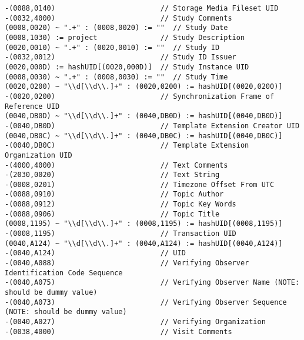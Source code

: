 \documentclass{beamer}  %
\begin{document}
\begin{frame}[fragile]
\tiny
\begin{verbatim}
-(0088,0140)                         // Storage Media Fileset UID
-(0032,4000)                         // Study Comments
(0008,0020) ~ ".+" : (0008,0020) := ""  // Study Date
(0008,1030) := project               // Study Description
(0020,0010) ~ ".+" : (0020,0010) := ""  // Study ID
-(0032,0012)                         // Study ID Issuer
(0020,000D) := hashUID[(0020,000D)]  // Study Instance UID
(0008,0030) ~ ".+" : (0008,0030) := ""  // Study Time
(0020,0200) ~ "\\d[\\d\\.]+" : (0020,0200) := hashUID[(0020,0200)]
-(0020,0200)                         // Synchronization Frame of Reference UID
(0040,DB0D) ~ "\\d[\\d\\.]+" : (0040,DB0D) := hashUID[(0040,DB0D)]
-(0040,DB0D)                         // Template Extension Creator UID
(0040,DB0C) ~ "\\d[\\d\\.]+" : (0040,DB0C) := hashUID[(0040,DB0C)]
-(0040,DB0C)                         // Template Extension Organization UID
-(4000,4000)                         // Text Comments
-(2030,0020)                         // Text String
-(0008,0201)                         // Timezone Offset From UTC
-(0088,0910)                         // Topic Author
-(0088,0912)                         // Topic Key Words
-(0088,0906)                         // Topic Title
(0008,1195) ~ "\\d[\\d\\.]+" : (0008,1195) := hashUID[(0008,1195)]
-(0008,1195)                         // Transaction UID
(0040,A124) ~ "\\d[\\d\\.]+" : (0040,A124) := hashUID[(0040,A124)]
-(0040,A124)                         // UID
-(0040,A088)                         // Verifying Observer Identification Code Sequence
-(0040,A075)                         // Verifying Observer Name (NOTE: should be dummy value)
-(0040,A073)                         // Verifying Observer Sequence (NOTE: should be dummy value)
-(0040,A027)                         // Verifying Organization
-(0038,4000)                         // Visit Comments
\end{verbatim}
\end{frame}
\end{document}
